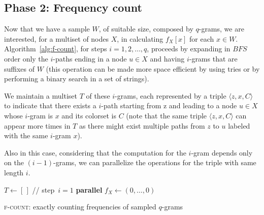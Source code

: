 \clearpage
\subsection*{Phase 2: Frequency count}

Now that we have a sample $W$, of suitable size, composed by $q$-grams, we are interested, for a multiset of nodes $X$, in calculating $f_{X}[x]$ for each $x \in W$. Algorithm~\ref{alg:f-count}, for steps $i = 1, 2, \ldots, q$, proceeds by expanding in $BFS$ order only the $i$-paths ending in a node $u \in X$ and having $i$-grams that are suffixes of $W$ (this operation can be made more space efficient by using tries or by performing a binary search in a set of strings).\medskip

We maintain a multiset $T$ of these $i$-grams, each represented by a triple $\langle z, x, C \rangle$ to indicate that there exists a $i$-path starting from z and leading to a node $u \in X$ whose $i$-gram is $x$ and its colorset is $C$ (note that the same triple $\langle z, x, C \rangle$ can appear more times in $T$ as there might exist multiple paths from $z$ to $u$ labeled with the same $i$-gram $x$).\medskip

Also in this case, considering that the computation for the $i$-gram depends only on the $(i-1)$-grams, we can parallelize the operations for the triple with same length $i$.

\begin{algorithm}[h]
	
	\small
	\DontPrintSemicolon
	\BlankLine
	$T\gets[\,]$ \quad // step~$i=1$\; 
	\BlankLine
	\textbf{parallel} 
	\BlankLine
	\BlankLine
	$f_X \gets (0,\ldots,0)$\;
	\BlankLine
	\BlankLine
	\caption{\textsc{f-count}: exactly counting frequencies of sampled $q$-grams}
	\label{alg:f-count}
\end{algorithm}

